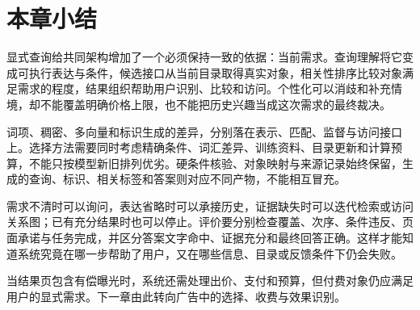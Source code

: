 \section{本章小结}
\label{sec:rs-search-summary}

显式查询给共同架构增加了一个必须保持一致的依据：当前需求。查询理解将它变成可执行表达与条件，候选接口从当前目录取得真实对象，相关性排序比较对象满足需求的程度，结果组织帮助用户识别、比较和访问。个性化可以消歧和补充情境，却不能覆盖明确价格上限，也不能把历史兴趣当成这次需求的最终裁决。

词项、稠密、多向量和标识生成的差异，分别落在表示、匹配、监督与访问接口上。选择方法需要同时考虑精确条件、词汇差异、训练资料、目录更新和计算预算，不能只按模型新旧排列优劣。硬条件核验、对象映射与来源记录始终保留，生成的查询、标识、相关标签和答案则对应不同产物，不能相互冒充。

需求不清时可以询问，表达省略时可以承接历史，证据缺失时可以迭代检索或访问关系图；已有充分结果时也可以停止。评价要分别检查覆盖、次序、条件违反、页面承诺与任务完成，并区分答案文字命中、证据充分和最终回答正确。这样才能知道系统究竟在哪一步帮助了用户，又在哪些信息、目录或反馈条件下仍会失败。

当结果页包含有偿曝光时，系统还需处理出价、支付和预算，但付费对象仍应满足用户的显式需求。下一章由此转向广告中的选择、收费与效果识别。
